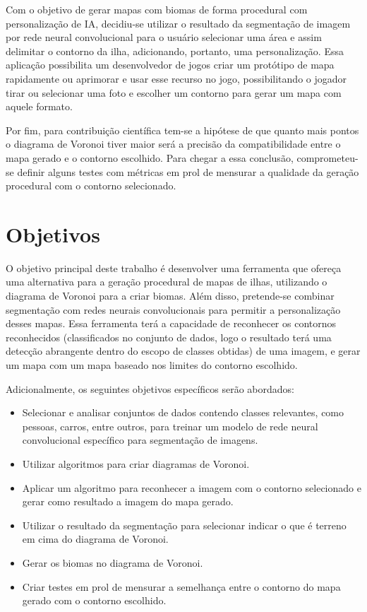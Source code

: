 Com o objetivo de gerar mapas com biomas de forma procedural com personalização de IA, decidiu-se utilizar o resultado da segmentação de imagem por rede neural convolucional para o usuário selecionar uma área e assim delimitar o contorno da ilha, adicionando, portanto, uma personalização. Essa aplicação possibilita um desenvolvedor de jogos criar um protótipo de mapa rapidamente ou aprimorar e usar esse recurso no jogo, possibilitando o jogador tirar ou selecionar uma foto e escolher um contorno para gerar um mapa com aquele formato.

Por fim, para contribuição científica tem-se a hipótese de que quanto mais pontos o diagrama de Voronoi tiver maior será a precisão da compatibilidade entre o mapa gerado e o contorno escolhido. Para chegar a essa conclusão, comprometeu-se definir alguns testes com métricas em prol de mensurar a qualidade da geração procedural com o contorno selecionado.

\section{Objetivos}

O objetivo principal deste trabalho é desenvolver uma ferramenta que ofereça uma alternativa para a geração procedural de mapas de ilhas, utilizando o diagrama de Voronoi para a criar biomas. Além disso, pretende-se combinar segmentação com redes neurais convolucionais para permitir a personalização desses mapas. Essa ferramenta terá a capacidade de reconhecer os contornos reconhecidos (classificados no conjunto de dados, logo o resultado terá uma detecção abrangente dentro do escopo de classes obtidas) de uma imagem, e gerar um mapa com um mapa baseado nos limites do contorno escolhido.

Adicionalmente, os seguintes objetivos específicos serão abordados:

\begin{itemize}
	\item Selecionar e analisar conjuntos de dados contendo classes relevantes, como pessoas, carros, entre outros, para treinar um modelo de rede neural convolucional específico para segmentação de imagens.
	\item Utilizar algoritmos para criar diagramas de Voronoi.
	\item Aplicar um algoritmo para reconhecer a imagem com o contorno selecionado e gerar como resultado a imagem do mapa gerado.
	\item Utilizar o resultado da segmentação para selecionar indicar o que é terreno em cima do diagrama de Voronoi.
	\item Gerar os biomas no diagrama de Voronoi.
	\item Criar testes em prol de mensurar a semelhança entre o contorno do mapa gerado com o contorno escolhido.
\end{itemize}